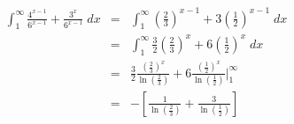 \documentclass[10pt]{article}
\begin{document}
\begin{eqnarray*}
\int_{1}^{\infty} \frac{4^{x-1}}{6^{x-1}} + \frac{3^x}{6^{x-1}} \; dx
  & = &   \int_{1}^{\infty} {\left( \frac{2}{3} \right)}^{x-1} + 3{\left( \frac{1}{2} \right) }^{x-1} \; dx \\
  & = &   \int_{1}^{\infty} \frac{3}{2} {\left( \frac{2}{3} \right)}^{x} + 6{\left( \frac{1}{2} \right) }^{x} \; dx \\
  & = &   \frac{3}{2} \frac{{ \left( \frac{2}{3} \right) }^{x}}{\ln (\frac{2}{3})} + 6 \frac{{\left( \frac{1}{2} \right) }^{x}}{\ln (\frac{1}{2})} \bigg|_{1}^{\infty} \\
  & = & - \left[ \frac{1}{\ln (\frac{2}{3})} + \frac{3}{\ln (\frac{1}{2})} \right]
\end{eqnarray*}
\end{document}
